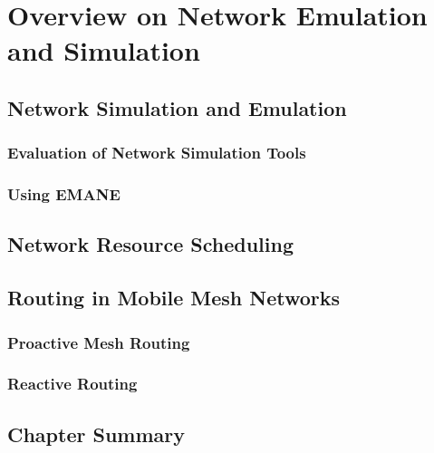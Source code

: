 \chapter{Overview on Network Emulation and Simulation}
\label{chapter2}

\section{Network Simulation and Emulation}

\subsection{Evaluation of Network Simulation Tools}

\subsection{Using EMANE}

\section{Network Resource Scheduling}
    
\section{Routing in Mobile Mesh Networks}

\subsection{Proactive Mesh Routing}

\subsection{Reactive Routing}

\section {Chapter Summary}

